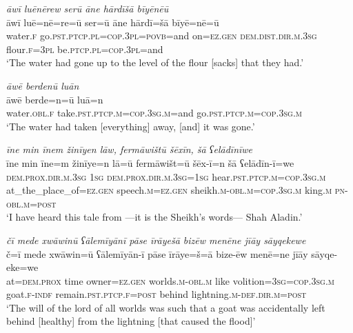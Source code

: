 \ea \label{ZB.28}
\textit{āwī luēnērew serū āne hārdīšā bīyēnēū} \\ 
\gll āwī luē=nē=re=ū ser=ū āne hārdī=šā bīyē=nē=ū \\ 
 water\textsc{.f} go\textsc{.pst}\textsc{.ptcp}\textsc{.pl}\textsc{=cop}\textsc{.3pl}\textsc{=\textsc{povb}}=and on\textsc{\textsc{=ez.gen}} \textsc{dem.dist}\textsc{.dir}\textsc{.m}\textsc{.3sg} flour\textsc{.f}\textsc{=3pl} be\textsc{.ptcp}\textsc{.pl}\textsc{=cop}\textsc{.3pl}=and \\ 
\glt `The water had gone up to the level of the flour [sacks] that they had.'
\z 
 
\ea \label{ZB.30}
\textit{āwē berdenū luān} \\ 
\gll āwē berde=n=ū luā=n \\ 
 water\textsc{.obl}\textsc{.f} take\textsc{.pst}\textsc{.ptcp}\textsc{.m}\textsc{=cop}\textsc{.3sg}\textsc{.m}=and go\textsc{.pst}\textsc{.ptcp}\textsc{.m}\textsc{=cop}\textsc{.3sg}\textsc{.m} \\ 
\glt `The water had taken [everything] away, [and] it was gone.'
\z 
 
\ea \label{ZB.37}
\textit{īne min īnem žinīyen lāw, fermāwištū šēxīn, šā ʕelādīnīwe} \\ 
\gll īne min īne=m žinīye=n lā=ū fermāwišt=ū šēx-ī=n šā ʕelādīn-ī=we \\ 
 \textsc{dem.prox}\textsc{.dir}\textsc{.m}\textsc{.3sg} \textsc{1sg} \textsc{dem.prox}\textsc{.dir}\textsc{.m}\textsc{.3sg}\textsc{=\textsc{1sg}} hear\textsc{.pst}\textsc{.ptcp}\textsc{.m}\textsc{=cop}\textsc{.3sg}\textsc{.m} at\_the\_place\_of\textsc{\textsc{=ez.gen}} speech\textsc{.m}\textsc{\textsc{=ez.gen}} sheikh\textsc{.m}\textsc{-obl}\textsc{.m}\textsc{=cop}\textsc{.3sg}\textsc{.m} king\textsc{.m} \textsc{pn}\textsc{-obl}\textsc{.m}\textsc{=\textsc{post}} \\ 
\glt `I have heard this tale from —it is the Sheikh’s words— Shah Aladin.'
\z 
 
\ea \label{ZB.42}
\textit{čī mede xwāwinū ʕālemīyānī pāse īrāyešā bizēw menēne jīāy sāyqekewe} \\ 
\gll č=ī mede xwāwin=ū ʕālemīyān-ī pāse īrāye=š=ā bize-ēw menē=ne jīāy sāyqe-eke=we \\ 
 at=\textsc{dem.prox} time owner\textsc{\textsc{=ez.gen}} worlds\textsc{.m}\textsc{-obl}\textsc{.m} like volition\textsc{=3sg}\textsc{=cop}\textsc{.3sg}\textsc{.m} goat\textsc{.f}\textsc{-indf} remain\textsc{.pst}\textsc{.ptcp}\textsc{.f}\textsc{=\textsc{post}} behind lightning\textsc{.m}\textsc{-def}\textsc{.dir}\textsc{.m}\textsc{=\textsc{post}} \\ 
\glt `The will of the lord of all worlds was such that a goat was accidentally left behind [healthy] from the lightning [that caused the flood]'
\z 
 
